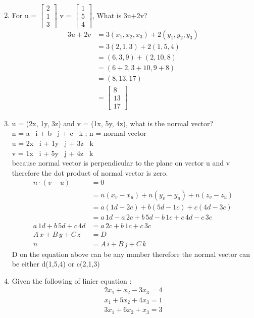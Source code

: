 \documentclass{article}
\begin{document}
\begin{enumerate}
\begin{align*}
  \end{align*}
  \item For u =  $  \begin{bmatrix}    2\\    1\\    3  \end{bmatrix}  $ v =     $  \begin{bmatrix}    1\\    5\\    4  \end{bmatrix}  $, What is 3u+2v? \begin{align*}
      3u + 2v &= 3(x_{1}, x_{2}, x_{3}) + 2(y_{1}, y_{2}, y_{3}) \\ &= 3(2,1,3) + 2(1,5,4) \\ &= (6,3,9) + (2,10,8) \\ &= (6+2, 3+10, 9+8) \\ &= (8, 13, 17) \\ &= \begin{bmatrix} 8\\13\\17 \end{bmatrix}  \end{align*}
  \item u = (2x, 1y, 3z) and v = (1x, 5y, 4z), what is the normal vector? \\ n = a \, i + b \, j + c \, k ; n = normal vector \\ u = 2x \, i + 1y \, j + 3z \, k \\ v = 1x \, i + 5y \, j + 4z \, k \\ because normal vector is perpendicular to the plane on vector u and v therefore the dot product of normal vector is zero.
  \begin{align*}
      n \cdot (v - u) &= 0 \\ &= n(x_{v} - x_{u}) + n(y_{v} - y_{u}) + n(z_{v} - z_{u}) \\ &= a(1d-2c) + b(5d-1c) + c(4d-3c) \\ &= a \, 1d - a \, 2c + b \, 5d - b \, 1c + c \, 4d - c \, 3c \\ a \, 1d + b \, 5d + c \, 4d &= a \, 2c + b \, 1c + c \, 3c\\ A \, x + B \, y + C \, z &= D \\ n &= A \, i + B \, j + C \, k
  \end{align*} D on the equation above can be any number therefore the normal vector can be either d(1,5,4) or c(2,1,3)
  \item Given the following of linier equation :  \begin{align*} 2x_{1} + x_{2} - 3x_{3} = 4 \\ x_{1} + 5x_{2} + 4x_{3} = 1 \\ 3x_{1} + 6x_{2} + x_{3} = 3 \end{align*}

\end{enumerate}
\end{document}
